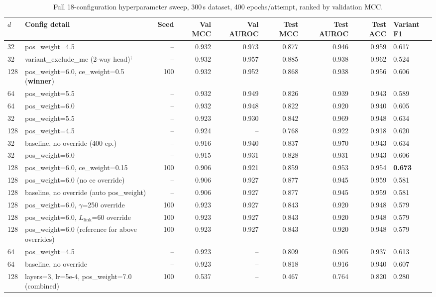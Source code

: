\begin{table}[htbp]
\centering
\small
\caption{Full 18-configuration hyperparameter sweep, 300\,s dataset, 400 epochs/attempt, ranked by validation MCC.}
\label{tab:tgn-val2-sweep-full}
\begin{tabular}{@{}llrrrrrrl@{}}
\toprule
$d$ & Config detail & Seed & Val MCC & Val AUROC & Test MCC & Test AUROC & Test ACC & Variant F1 \\
\midrule
32  & pos\_weight=4.5                                & --  & 0.932 & 0.973 & 0.877 & 0.946 & 0.959 & 0.617 \\
32  & variant\_exclude\_me (2-way head)$^{\dagger}$   & --  & 0.932 & 0.957 & 0.885 & 0.938 & 0.962 & 0.524 \\
128 & pos\_weight=6.0, ce\_weight=0.5 (\textbf{winner}) & 100 & 0.932 & 0.952 & 0.868 & 0.938 & 0.956 & 0.606 \\
64  & pos\_weight=5.5                                 & --  & 0.932 & 0.949 & 0.826 & 0.939 & 0.943 & 0.589 \\
64  & pos\_weight=6.0                                 & --  & 0.932 & 0.948 & 0.822 & 0.920 & 0.940 & 0.605 \\
32  & pos\_weight=5.5                                 & --  & 0.923 & 0.930 & 0.842 & 0.969 & 0.948 & 0.634 \\
128 & pos\_weight=4.5                                 & --  & 0.924 & --    & 0.768 & 0.922 & 0.918 & 0.620 \\
32  & baseline, no override (400 ep.)                 & --  & 0.916 & 0.940 & 0.837 & 0.970 & 0.943 & 0.634 \\
32  & pos\_weight=6.0                                 & --  & 0.915 & 0.931 & 0.828 & 0.931 & 0.943 & 0.606 \\
128 & pos\_weight=6.0, ce\_weight=0.15                 & 100 & 0.906 & 0.921 & 0.859 & 0.953 & 0.954 & \textbf{0.673} \\
128 & pos\_weight=6.0 (no ce override)                 & --  & 0.906 & 0.927 & 0.877 & 0.945 & 0.959 & 0.581 \\
128 & baseline, no override (auto pos\_weight)         & --  & 0.906 & 0.927 & 0.877 & 0.945 & 0.959 & 0.581 \\
128 & pos\_weight=6.0, $\gamma$=250 override            & 100 & 0.923 & 0.927 & 0.843 & 0.920 & 0.948 & 0.579 \\
128 & pos\_weight=6.0, $L_{\text{link}}$=60 override    & 100 & 0.923 & 0.927 & 0.843 & 0.920 & 0.948 & 0.579 \\
128 & pos\_weight=6.0 (reference for above overrides)   & 100 & 0.923 & 0.927 & 0.843 & 0.920 & 0.948 & 0.579 \\
64  & pos\_weight=4.5                                 & --  & 0.923 & --    & 0.809 & 0.905 & 0.937 & 0.613 \\
64  & baseline, no override                           & --  & 0.923 & --    & 0.818 & 0.916 & 0.940 & 0.607 \\
128 & layers=3, lr=5e-4, pos\_weight=7.0 (combined)     & 100 & 0.537 & --    & 0.467 & 0.764 & 0.820 & 0.280 \\
\bottomrule
\end{tabular}


\end{table}
